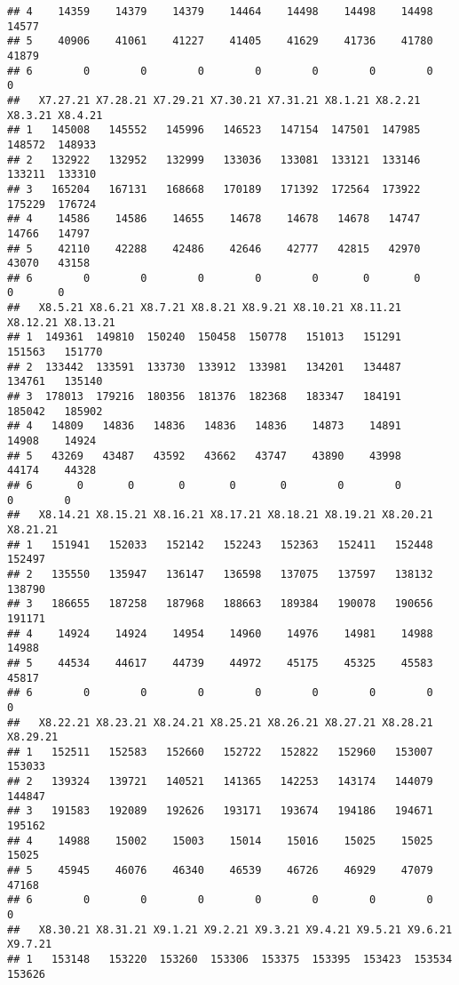 \documentclass[
]{article}
\begin{document}
\begin{verbatim}
## 4    14359    14379    14379    14464    14498    14498    14498    14577
## 5    40906    41061    41227    41405    41629    41736    41780    41879
## 6        0        0        0        0        0        0        0        0
##   X7.27.21 X7.28.21 X7.29.21 X7.30.21 X7.31.21 X8.1.21 X8.2.21 X8.3.21 X8.4.21
## 1   145008   145552   145996   146523   147154  147501  147985  148572  148933
## 2   132922   132952   132999   133036   133081  133121  133146  133211  133310
## 3   165204   167131   168668   170189   171392  172564  173922  175229  176724
## 4    14586    14586    14655    14678    14678   14678   14747   14766   14797
## 5    42110    42288    42486    42646    42777   42815   42970   43070   43158
## 6        0        0        0        0        0       0       0       0       0
##   X8.5.21 X8.6.21 X8.7.21 X8.8.21 X8.9.21 X8.10.21 X8.11.21 X8.12.21 X8.13.21
## 1  149361  149810  150240  150458  150778   151013   151291   151563   151770
## 2  133442  133591  133730  133912  133981   134201   134487   134761   135140
## 3  178013  179216  180356  181376  182368   183347   184191   185042   185902
## 4   14809   14836   14836   14836   14836    14873    14891    14908    14924
## 5   43269   43487   43592   43662   43747    43890    43998    44174    44328
## 6       0       0       0       0       0        0        0        0        0
##   X8.14.21 X8.15.21 X8.16.21 X8.17.21 X8.18.21 X8.19.21 X8.20.21 X8.21.21
## 1   151941   152033   152142   152243   152363   152411   152448   152497
## 2   135550   135947   136147   136598   137075   137597   138132   138790
## 3   186655   187258   187968   188663   189384   190078   190656   191171
## 4    14924    14924    14954    14960    14976    14981    14988    14988
## 5    44534    44617    44739    44972    45175    45325    45583    45817
## 6        0        0        0        0        0        0        0        0
##   X8.22.21 X8.23.21 X8.24.21 X8.25.21 X8.26.21 X8.27.21 X8.28.21 X8.29.21
## 1   152511   152583   152660   152722   152822   152960   153007   153033
## 2   139324   139721   140521   141365   142253   143174   144079   144847
## 3   191583   192089   192626   193171   193674   194186   194671   195162
## 4    14988    15002    15003    15014    15016    15025    15025    15025
## 5    45945    46076    46340    46539    46726    46929    47079    47168
## 6        0        0        0        0        0        0        0        0
##   X8.30.21 X8.31.21 X9.1.21 X9.2.21 X9.3.21 X9.4.21 X9.5.21 X9.6.21 X9.7.21
## 1   153148   153220  153260  153306  153375  153395  153423  153534  153626

\end{verbatim}
\end{document}
